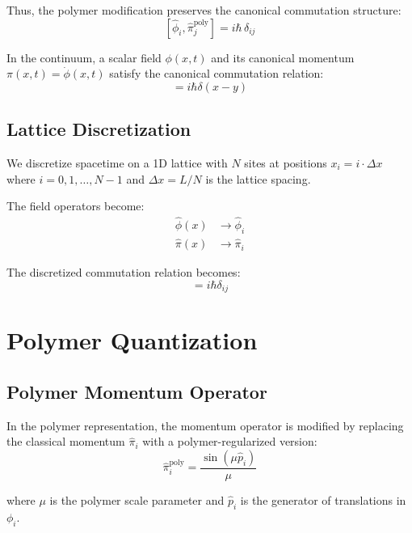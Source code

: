 \documentclass[12pt]{article}
\begin{document}
Thus, the polymer modification preserves the canonical commutation structure:
\begin{equation}
\boxed{[\hat{\phi}_i, \hat{\pi}_j^{\text{poly}}] = i\hbar\,\delta_{ij}}
\end{equation}

In the continuum, a scalar field $\phi(x,t)$ and its canonical momentum $\pi(x,t) = \dot{\phi}(x,t)$ satisfy the canonical commutation relation:
\begin{equation}
[\hat{\phi}(x), \hat{\pi}(y)] = i\hbar\delta(x-y)
\end{equation}

\subsection{Lattice Discretization}

We discretize spacetime on a 1D lattice with $N$ sites at positions $x_i = i \cdot \Delta x$ where $i = 0, 1, \ldots, N-1$ and $\Delta x = L/N$ is the lattice spacing.

The field operators become:
\begin{align}
\hat{\phi}(x) &\rightarrow \hat{\phi}_i \\
\hat{\pi}(x) &\rightarrow \hat{\pi}_i
\end{align}

The discretized commutation relation becomes:
\begin{equation}
[\hat{\phi}_i, \hat{\pi}_j] = i\hbar\delta_{ij}
\end{equation}

\section{Polymer Quantization}

\subsection{Polymer Momentum Operator}

In the polymer representation, the momentum operator is modified by replacing the classical momentum $\hat{\pi}_i$ with a polymer-regularized version:
\begin{equation}
\hat{\pi}_i^{\text{poly}} = \frac{\sin(\mu \hat{p}_i)}{\mu}
\end{equation}

where $\mu$ is the polymer scale parameter and $\hat{p}_i$ is the generator of translations in $\phi_i$.
\end{document}
